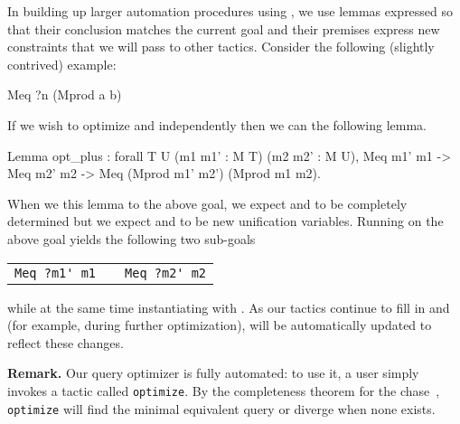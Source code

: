 \documentclass[preprint]{sigplanconf}
\begin{document}
In building up larger automation procedures using , we use lemmas expressed so that their conclusion matches the current goal and their premises express new constraints that we will pass to other tactics.
Consider the following (slightly contrived) example:
\begin{coq}
Meq ?n (Mprod a b)
\end{coq}
If we wish to optimize  and  independently then we can  the following lemma.
\begin{coq}
Lemma opt_plus : forall {T U} (m1 m1' : M T) (m2 m2' : M U),
  Meq m1' m1 ->
  Meq m2' m2 ->
  Meq (Mprod m1' m2') (Mprod m1 m2).
\end{coq}
When we  this lemma to the above goal, we expect  and  to be completely determined but we expect  and  to be new unification variables.
Running  on the above goal yields the following two sub-goals
\begin{center}
\begin{tabular}{ccc}
\lstinline!Meq ?m1' m1! & \qquad & \lstinline!Meq ?m2' m2! \\
\end{tabular}
\end{center}
while at the same time instantiating  with .
As our tactics continue to fill in  and  (for example, during further optimization),  will be automatically updated to reflect these changes.  

\textbf{Remark.}
Our query optimizer is fully automated: to use it, a user simply invokes a tactic called {\tt optimize}.
By the completeness theorem for the chase~\cite{Popa99anequational}, {\tt optimize} will find the minimal equivalent query or diverge when none exists.


\end{document}
